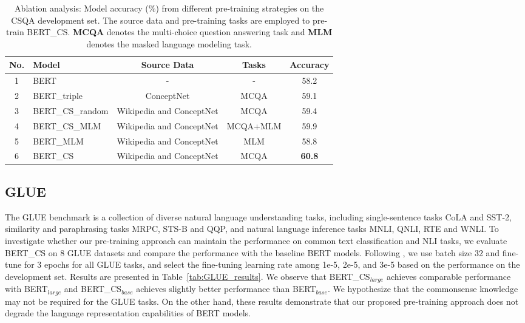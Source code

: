 \documentclass[11pt,a4paper]{article}
\begin{document}
\begin{table*}[t!]
\begin{center}
		\small
		\begin{tabular}{c|p{2.5cm}|c|c|c}
			\toprule
			\textbf{No.} &
            \textbf{Model}      & \textbf{Source Data}  & \textbf{Tasks}       & \textbf{Accuracy}  \\
            \midrule
            1 & BERT   & -  & -    & 58.2     \\
            \midrule
            2 & BERT\_triple & ConceptNet & MCQA    & 59.1     \\
            \midrule
            3 & BERT\_CS\_random  & Wikipedia and ConceptNet  &  MCQA     & 59.4 \\
            \midrule
            4 & BERT\_CS\_MLM    & Wikipedia and ConceptNet & MCQA+MLM              & 59.9  \\
            \midrule
            5 & BERT\_MLM    & Wikipedia and ConceptNet & MLM              & 58.8  \\
            \midrule
            6 & BERT\_CS & Wikipedia and ConceptNet & MCQA  & \textbf{60.8}  \\
			\bottomrule
		\end{tabular}
	\end{center}
	\caption{Ablation analysis: Model accuracy (\%) from different pre-training strategies on the CSQA development set. The source data and pre-training tasks are employed to pre-train BERT\_CS. \textbf{MCQA} denotes the multi-choice question answering task and \textbf{MLM} denotes the masked language modeling task.}
	\label{tab:analysis}
\end{table*}

\subsection{GLUE}
The GLUE benchmark \citep{wang-etal-2018-glue} is a collection of diverse natural language understanding tasks, including single-sentence tasks CoLA and SST-2, similarity and paraphrasing tasks MRPC, STS-B and QQP, and natural language inference tasks MNLI, QNLI, RTE and WNLI.
To investigate whether our pre-training approach can maintain the performance on common text classification and NLI tasks, we evaluate BERT\_CS on 8 GLUE datasets and compare the performance with the baseline BERT models.
Following \citet{devlin-etal-2019-bert}, we use batch size 32 and fine-tune for 3 epochs for all GLUE tasks, and select the fine-tuning learning rate among 1e-5, 2e-5, and 3e-5 based on the performance on the development set.
Results are presented in Table~\ref{tab:GLUE_results}. 
We observe that BERT\_CS$_{large}$ achieves comparable performance with BERT$_{large}$ and BERT\_CS$_{base}$ achieves slightly better performance than BERT$_{base}$.  We hypothesize that the commonsense knowledge may not be required for the GLUE tasks. On the other hand, these results demonstrate that our proposed pre-training approach does not degrade the language representation capabilities of BERT models. 
\end{document}
